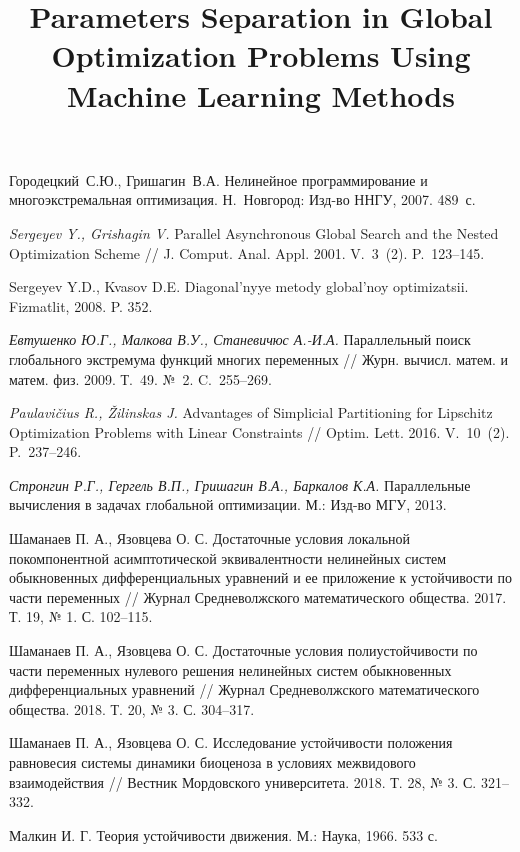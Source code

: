 \documentclass[11pt, oneside, a4paper]{article}
\begin{document}
\begin{biblio}

 Городецкий~С.Ю., Гришагин~В.А. Нелинейное программирование и многоэкстремальная оптимизация. Н.~Новгород: Изд-во ННГУ, 2007. 489~с.

{\it Sergeyev Y., Grishagin V.} Parallel Asynchronous Global Search and the Nested Optimization Scheme // J. Comput. Anal. Appl. 2001. V.~3~(2). P.~123--145.

 Sergeyev Y.D., Kvasov D.E. Diagonal'nyye metody global'noy optimizatsii. Fizmatlit, 2008. P. 352.

{\it Евтушенко Ю.Г., Малкова В.У., Станевичюс А.-И.А.} Параллельный поиск глобального экстремума функций многих переменных // Журн. вычисл. матем. и матем. физ. 2009. Т.~49. №~2. C.~255--269.

{\it Paulavi{\v c}ius R., {\v Z}ilinskas J.} Advantages of Simplicial Partitioning for Lipschitz Optimization Problems with Linear Constraints // Optim. Lett. 2016. V.~10~(2). P.~237--246.

{\it Стронгин Р.Г., Гергель В.П., Гришагин В.А., Баркалов К.А.} Параллельные вычисления в задачах глобальной оптимизации. М.: Изд-во МГУ, 2013.


 Шаманаев П. А., Язовцева О. С. Достаточные условия локальной покомпонентной асимптотической эквивалентности нелинейных систем обыкновенных дифференциальных уравнений и ее приложение к устойчивости по части переменных // Журнал Средневолжского математического общества. 2017. Т. 19, № 1. С. 102--115.

 Шаманаев П. А., Язовцева О. С. Достаточные условия полиустойчивости по части переменных нулевого решения нелинейных систем обыкновенных дифференциальных уравнений // Журнал Средневолжского математического общества.  2018. Т. 20, № 3. С. 304--317.

 Шаманаев П. А., Язовцева О. С. Исследование устойчивости положения равновесия системы динамики биоценоза в условиях межвидового взаимодействия // Вестник Мордовского университета. 2018. Т. 28, № 3. С. 321–332.

 Малкин И. Г. Теория устойчивости движения. М.: Наука, 1966. 533 с.

\end{biblio}

\title{Parameters Separation in Global Optimization Problems Using Machine Learning Methods}

\end{document}
